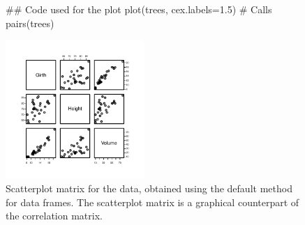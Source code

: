 \begin{figure}
\vspace*{-6pt}

\begin{minipage}[c]{0.55\linewidth}
\vspace*{6pt}

\begin{Schunk}
\begin{Sinput}
## Code used for the plot
plot(trees, cex.labels=1.5)
  # Calls pairs(trees)
\end{Sinput}
\end{Schunk}
\end{minipage}
\begin{minipage}[c]{0.465\linewidth}
\begin{Schunk}


\centerline{\includegraphics[width=0.47\textwidth]{figs/05-plot-trees-1} }

\end{Schunk}
\vspace*{-15pt}

\end{minipage}
\caption{Scatterplot matrix for the  data, obtained
  using the default  method for data frames.  The
  scatterplot matrix is a graphical counterpart of the correlation
  matrix.\label{fig:trees}}
\end{figure}

